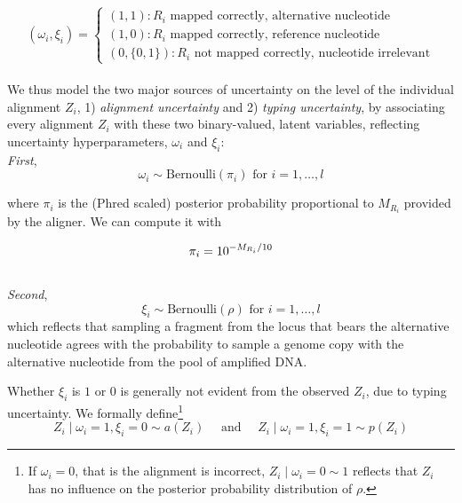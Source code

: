 \documentclass[authoryear,preprint,11pt]{scrartcl}
\begin{document}
\begin{equation}
 \label{eq.read-cases}
 (\omega_i,\xi_i) =
 \begin{cases}
  (1,1): R_i \text{ mapped correctly, alternative nucleotide}  \\
  (1,0): R_i \text{ mapped correctly, reference nucleotide} \\
  (0,\{0,1\}): R_i \text{ not mapped correctly, nucleotide irrelevant}
 \end{cases}
\end{equation}\\

We thus model the two major sources of uncertainty on the level of the individual alignment $Z_i$, 1) \emph{alignment uncertainty} and 2) \emph{typing uncertainty}, by associating every alignment $Z_i$ with these two binary-valued, latent variables, reflecting uncertainty hyperparameters, $\omega_i$ and $\xi_i$:\\

\emph{First},
\begin{equation}
 \label{eq.map-prob}
 \omega_i \sim \text{Bernoulli}\left(\pi_i \right) \text{ for }i=1,\dots,l
\end{equation}

where $\pi_i$ is the (Phred scaled) posterior probability proportional to $M_{R_i}$ provided by the aligner.
We can compute it with

\begin{equation}
 \label{eq.MQ.phred}
 \pi_i = 10^{-M_{R_i}/10} \\
\end{equation}\\

\emph{Second},
\begin{equation}
 \label{eq.var-prob}
 \xi_i \sim \text{Bernoulli}\left(\rho \right) \text{ for }i=1,\dots,l
\end{equation}
which reflects that sampling a fragment from the locus that bears the alternative nucleotide agrees with the probability to sample a genome copy with the alternative nucleotide from the pool of amplified DNA. 

Whether $\xi_i$ is $1$ or $0$ is generally not evident from the observed $Z_i$, due to typing uncertainty.
We formally define\footnote{
 If $\omega_i=0$, that is the alignment is incorrect, $Z_i \mid \omega_i = 0 \sim 1$ reflects that $Z_i$ has no influence on the posterior probability distribution of $\rho$.
}
\begin{equation}
 \label{eq.abs-pres}
 Z_i \mid \omega_i = 1, \xi_i = 0 \sim a(Z_i) \quad\text{ and }\quad
 Z_i \mid \omega_i = 1, \xi_i = 1 \sim p(Z_i)
\end{equation}
\end{document}

